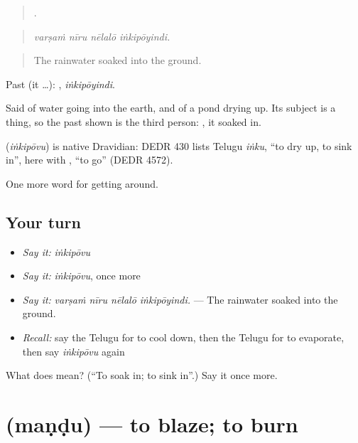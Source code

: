\begin{quote}
   .
\end{quote}

\begin{quote}
\emph{varṣaṁ nīru nēlalō iṅkipōyindi.}
\end{quote}

\begin{quote}
The rainwater soaked into the ground.
\end{quote}

Past (it …): , \emph{iṅkipōyindi}.

Said of water going into the earth, and of a pond drying up. Its subject is a thing, so the past shown is the third person: , it soaked in.

\begin{cousinweb}
\textbf{} (\emph{iṅkipōvu}) is native Dravidian: DEDR 430 lists Telugu \emph{iṅku}, \textquotedblleft{}to dry up, to sink in\textquotedblright{}, here with , \textquotedblleft{}to go\textquotedblright{} (DEDR 4572).
\end{cousinweb}

\begin{grammarlens}[title={What you've built}]
One more word for getting around.
\end{grammarlens}

\subsection*{Your turn}
\begin{itemize}
\raggedright
  \item \emph{Say it:} \emph{iṅkipōvu}
  \item \emph{Say it:} \emph{iṅkipōvu}, once more
  \item \emph{Say it:} \emph{varṣaṁ nīru nēlalō iṅkipōyindi.} — The rainwater soaked into the ground.
  \item \emph{Recall:} say the Telugu for to cool down, then the Telugu for to evaporate, then say \emph{iṅkipōvu} again
\end{itemize}

\begin{tcolorbox}[breakable,colback=teal!4,colframe=teal!35!black,title={Before you move on}]
What does  mean? (\textquotedblleft{}To soak in; to sink in\textquotedblright{}.) Say it once more.
\end{tcolorbox}
\section[\texorpdfstring{\te{మండు} (maṇḍu)}{మండు (maṇḍu)}]{ (maṇḍu) — to blaze; to burn}

